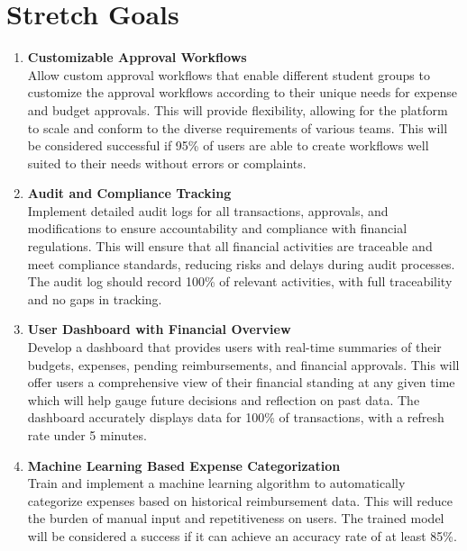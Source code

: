\documentclass{article}
\begin{document}
\section{Stretch Goals}

\begin{enumerate}
    \item \textbf{Customizable Approval Workflows} \\
    Allow custom approval workflows that enable different student groups to customize the approval workflows according to their unique needs for expense and budget approvals. This will provide flexibility, allowing for the platform to scale and conform to the diverse requirements of various teams. This will be considered successful if 95\% of users are able to create workflows well suited to their needs without errors or complaints.
    
    \item \textbf{Audit and Compliance Tracking} \\
    Implement detailed audit logs for all transactions, approvals, and modifications to ensure accountability and compliance with financial regulations. This will ensure that all financial activities are traceable and meet compliance standards, reducing risks and delays during audit processes. The audit log should record 100\% of relevant activities, with full traceability and no gaps in tracking.
    
    \item \textbf{User Dashboard with Financial Overview} \\
    Develop a dashboard that provides users with real-time summaries of their budgets, expenses, pending reimbursements, and financial approvals. This will offer users a comprehensive view of their financial standing at any given time which will help gauge future decisions and reflection on past data. The dashboard accurately displays data for 100\% of transactions, with a refresh rate under 5 minutes.
    
    \item \textbf{Machine Learning Based Expense Categorization} \\
    Train and implement a machine learning algorithm to automatically categorize expenses based on historical reimbursement data. This will reduce the burden of manual input and repetitiveness on users. The trained model will be considered a success if it can achieve an accuracy rate of at least 85\%.
\end{enumerate}
\end{document}
